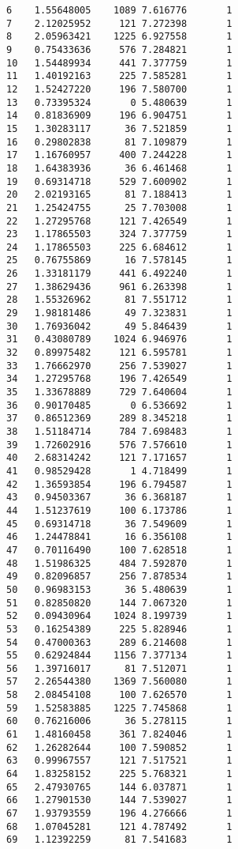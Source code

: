 \documentclass[
  letterpaper,
  DIV=11,
  numbers=noendperiod]{scrreprt}
\begin{document}
\begin{verbatim}
6    1.55648005    1089 7.616776       1
7    2.12025952     121 7.272398       1
8    2.05963421    1225 6.927558       1
9    0.75433636     576 7.284821       1
10   1.54489934     441 7.377759       1
11   1.40192163     225 7.585281       1
12   1.52427220     196 7.580700       1
13   0.73395324       0 5.480639       1
14   0.81836909     196 6.904751       1
15   1.30283117      36 7.521859       1
16   0.29802838      81 7.109879       1
17   1.16760957     400 7.244228       1
18   1.64383936      36 6.461468       1
19   0.69314718     529 7.600902       1
20   2.02193165      81 7.188413       1
21   1.25424755      25 7.703008       1
22   1.27295768     121 7.426549       1
23   1.17865503     324 7.377759       1
24   1.17865503     225 6.684612       1
25   0.76755869      16 7.578145       1
26   1.33181179     441 6.492240       1
27   1.38629436     961 6.263398       1
28   1.55326962      81 7.551712       1
29   1.98181486      49 7.323831       1
30   1.76936042      49 5.846439       1
31   0.43080789    1024 6.946976       1
32   0.89975482     121 6.595781       1
33   1.76662970     256 7.539027       1
34   1.27295768     196 7.426549       1
35   1.33678889     729 7.640604       1
36   0.90170485       0 6.536692       1
37   0.86512369     289 8.345218       1
38   1.51184714     784 7.698483       1
39   1.72602916     576 7.576610       1
40   2.68314242     121 7.171657       1
41   0.98529428       1 4.718499       1
42   1.36593854     196 6.794587       1
43   0.94503367      36 6.368187       1
44   1.51237619     100 6.173786       1
45   0.69314718      36 7.549609       1
46   1.24478841      16 6.356108       1
47   0.70116490     100 7.628518       1
48   1.51986325     484 7.592870       1
49   0.82096857     256 7.878534       1
50   0.96983153      36 5.480639       1
51   0.82850820     144 7.067320       1
52   0.09430964    1024 8.199739       1
53   0.16254389     225 5.828946       1
54   0.47000363     289 6.214608       1
55   0.62924844    1156 7.377134       1
56   1.39716017      81 7.512071       1
57   2.26544380    1369 7.560080       1
58   2.08454108     100 7.626570       1
59   1.52583885    1225 7.745868       1
60   0.76216006      36 5.278115       1
61   1.48160458     361 7.824046       1
62   1.26282644     100 7.590852       1
63   0.99967557     121 7.517521       1
64   1.83258152     225 5.768321       1
65   2.47930765     144 6.037871       1
66   1.27901530     144 7.539027       1
67   1.93793559     196 4.276666       1
68   1.07045281     121 4.787492       1
69   1.12392259      81 7.541683       1

\end{verbatim}
\end{document}
